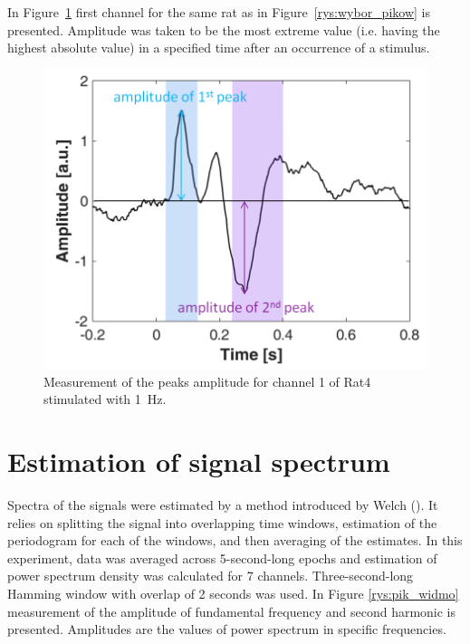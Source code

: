 \documentclass{pracalicmgr}
\begin{document}
   In Figure~\ref{rys:amplitude} first channel for the same rat as in Figure~\ref{rys:wybor_pikow} is presented. Amplitude was taken to be the most extreme value (i.e. having the highest absolute value) in a specified time after an occurrence of a stimulus.
   \begin{figure}[H]
   	\begin{center}
   		\includegraphics[scale=0.45]{usrednianie_z_tlem3.png}
   	\end{center}
   	\caption{Measurement of the peaks amplitude for channel 1 of Rat4 stimulated with 1~Hz. }
   	\label{rys:amplitude}
   \end{figure} 
   
   
   \section{Estimation of signal spectrum}
   Spectra of the signals were estimated by a method introduced by Welch (\cite{welch}). It relies  on splitting the signal into overlapping time windows, estimation of the periodogram for each of the windows, and then averaging of the estimates. In this experiment, data was averaged across 5-second-long epochs and estimation of power spectrum density was calculated for 7 channels. Three-second-long Hamming window with overlap of 2 seconds was used. In Figure \ref{rys:pik_widmo} measurement of the amplitude of fundamental frequency and second harmonic is presented. Amplitudes are the values of power spectrum in specific frequencies. 
   
\end{document}
